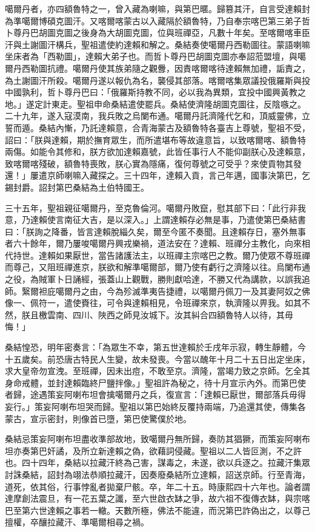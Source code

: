 \begin{pinyinscope}
噶爾丹者，亦四額魯特之一，曾入藏為喇嘛，與第巴暱。歸篡其汗，自言受達賴封為準噶爾博碩克圖汗。又喀爾喀蒙古以入藏隔於額魯特，乃自奉宗喀巴第三弟子哲卜尊丹巴胡圖克圖之後身為大胡圖克圖，位與班禪亞，凡數十年矣。至喀爾喀車臣汗與土謝圖汗構兵，聖祖遣使約達賴和解之。桑結奏使噶爾丹西勒圖往。蒙語喇嘛坐床者為「西勒圖」，達賴大弟子也。而哲卜尊丹巴胡圖克圖亦奉詔蒞盟壇，與噶爾丹西勒圖抗禮。噶爾丹使其族弟隨之觀釁，因責喀爾喀待達賴無加禮，詬責之，為土謝圖汗所殺。噶爾丹遂以報仇為名，襲侵其部落。喀爾喀集眾議投俄羅斯與投中國孰利，哲卜尊丹巴曰：「俄羅斯持教不同，必以我為異類，宜投中國興黃教之地。」遂定計東走。聖祖申命桑結遣使罷兵。桑結使濟隆胡圖克圖往，反陰嗾之。二十九年，遂入寇漠南，我兵敗之烏闌布通。噶爾丹託濟隆代乞和，頂威靈佛，立誓而遁。桑結內慚，乃託達賴意，合青海蒙古及額魯特各臺吉上尊號，聖祖不受，詔曰：「朕與達賴，期於撫育眾生，而所遣堪布等故違意旨，以致喀爾喀、額魯特兩傷。如能令其修和，朕方欲加達賴嘉號，此皆任事行人不能仰副朕心及達賴意，致喀爾喀殘破，額魯特喪敗，朕心實為隱痛，復何尊號之可受乎？來使貢物其發還！」屢遣京師喇嘛入藏探之。三十四年，達賴入貢，言己年邁，國事決第巴，乞錫封爵。詔封第巴桑結為土伯特國王。

三十五年，聖祖親征噶爾丹，至克魯倫河。噶爾丹敗竄，慰其部下曰：「此行非我意，乃達賴使言南征大吉，是以深入。」上謂達賴存必無是事，乃遣使第巴桑結書曰：「朕詢之降番，皆言達賴脫緇久矣，爾至今匿不奏聞。且達賴存日，塞外無事者六十餘年，爾乃屢唆噶爾丹興戎樂禍，道法安在？達賴、班禪分主教化，向來相代持世。達賴如果厭世，當告諸護法主，以班禪主宗喀巴之教。爾乃使眾不尊班禪而尊己，又阻班禪進京，朕欲和解準噶爾部，爾乃使有虧行之濟隆以往。烏闌布通之役，為賊軍卜日誦經，張蓋山上觀戰，勝則獻哈達，不勝又代為講款，以誤我追師。繄爾袒庇噶爾丹之由，今為殄滅準夷告捷禮，以噶爾丹佩刀一及其妻阿奴之佛像一、佩符一，遣使賚往，可令與達賴相見，令班禪來京，執濟隆以畀我。如其不然，朕且檄雲南、四川、陜西之師見汝城下。汝其糾合四額魯特人以待，其毋悔！」

桑結惶恐，明年密奏言：「為眾生不幸，第五世達賴於壬戌年示寂，轉生靜體，今十五歲矣。前恐唐古特民人生變，故未發喪。今當以醜年十月二十五日出定坐床，求大皇帝勿宣洩。至班禪，因未出痘，不敢至京。濟隆，當竭力致之京師。乞全其身命戒體，並封達賴臨終尸鹽拌像。」聖祖許為秘之，待十月宣示內外。而第巴使者歸，途遇策妄阿喇布坦會擒噶爾丹之兵，復宣言：「達賴已厭世，爾部落兵毋得妄行。」策妄阿喇布坦哭而歸。聖祖以第巴始終反覆持兩端，乃追還其使，傳集各蒙古，宣示密封，則像首已墮，第巴使驚僕於地。

桑結忌策妄阿喇布坦盡收準部故地，致噶爾丹無所歸，奏防其猖獗，而策妄阿喇布坦亦奏第巴奸譎，及所立新達賴之偽，欲藉詞侵藏。聖祖以二人皆叵測，不之許也。四十四年，桑結以拉藏汗終為己害，謀毒之，未遂，欲以兵逐之。拉藏汗集眾討誅桑結，詔封為翊法恭順拉藏汗，因奏廢桑結所立達賴，詔送京師。行至青海，道死，依其俗，行事悖亂者拋棄尸骸。卒，年二十五。時康熙四十六年也。論者謂達摩創法震旦，有一花五葉之讖，至六世啟衣缽之爭，故六祖不復傳衣缽，與宗喀巴至第六世達賴之事若一轍。天數所極，佛法不能違，而況第巴詐偽出之，以尊己擅權，卒釀拉藏汗、準噶爾相尋之禍。


\end{pinyinscope}
